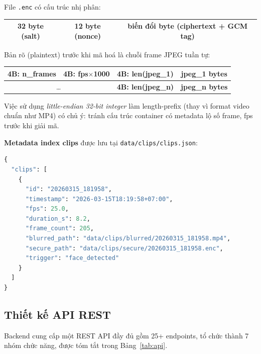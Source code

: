 File \texttt{.enc} có cấu trúc nhị phân:
\begin{center}
\begin{tabular}{|c|c|c|}
\hline
\textbf{32 byte (salt)} & \textbf{12 byte (nonce)} & \textbf{biến đổi byte (ciphertext + GCM tag)} \\
\hline
\end{tabular}
\end{center}

Bản rõ (plaintext) trước khi mã hoá là chuỗi frame JPEG tuần tự:
\begin{center}
\begin{tabular}{|c|c|c|c|}
\hline
\textbf{4B: n\_frames} & \textbf{4B: fps$\times$1000} & \textbf{4B: len(jpeg\_1)} & \textbf{jpeg\_1 bytes} \\
\hline
\multicolumn{2}{|c|}{\ldots} & \textbf{4B: len(jpeg\_n)} & \textbf{jpeg\_n bytes} \\
\hline
\end{tabular}
\end{center}

Việc sử dụng \textit{little-endian 32-bit integer} làm length-prefix (thay vì format video chuẩn như MP4) có chủ ý: tránh cấu trúc container có metadata lộ số frame, fps trước khi giải mã.

\textbf{Metadata index clips} được lưu tại \texttt{data/clips/clips.json}:
\begin{lstlisting}[language=Python, caption={Cấu trúc metadata clip trong clips.json}]
{
  "clips": [
    {
      "id": "20260315_181958",
      "timestamp": "2026-03-15T18:19:58+07:00",
      "fps": 25.0,
      "duration_s": 8.2,
      "frame_count": 205,
      "blurred_path": "data/clips/blurred/20260315_181958.mp4",
      "secure_path": "data/clips/secure/20260315_181958.enc",
      "trigger": "face_detected"
    }
  ]
}
\end{lstlisting}

\subsection{Thiết kế API REST}
\label{subsec:apidesign}

Backend cung cấp một REST API đầy đủ gồm 25+ endpoints, tổ chức thành 7 nhóm chức năng, được tóm tắt trong Bảng~\ref{tab:api}.

